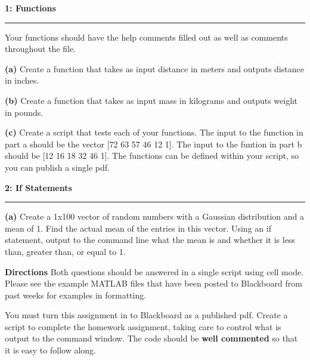 \documentclass[11pt]{article}
\newcommand\question[2]{\vspace{.25in}\textbf{#1: #2}\vspace{.5em}\hrule\vspace{.10in}}
\renewcommand\part[1]{\vspace{.10in}\textbf{(#1)}}
\begin{document}
\raggedright

\question{1}{Functions} 
Your functions should have the help comments filled out as well as comments throughout the file.

\part{a} Create a function that takes as input distance in meters and outputs distance in inches.

\part{b} Create a function that takes as input mass in kilograms and outputs weight in pounds.

\part{c} Create a script that tests each of your functions. 
The input to the function in part a should be the vector [72 63 57 46 12 1]. 
The input to the funtion in part b should be [12 16 18 32 46 1].
The functions can be defined within your script, so you can publish a single pdf. 

\question{2}{If Statements}
\part{a} Create a 1x100 vector of random numbers with a Gaussian distribution and a mean of 1.
Find the actual mean of the entries in this vector. 
Using an if statement, output to the command line what the mean is and whether it is less than, greater than, or equal to 1.



\vspace{1.0em}
\textbf{Directions}
Both questions should be answered in a single script using cell mode. Please see the example MATLAB files that have been posted to Blackboard from past weeks for examples in formatting.


You must turn this assignment in to Blackboard as a published pdf. Create a script to complete the homework assignment, taking care to control what is output to the command window. The code should be \textbf{well commented} so that it is easy to follow along. 
\end{document}
